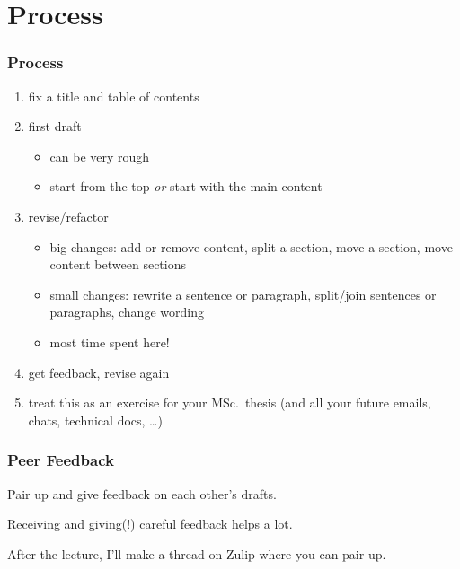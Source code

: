 \documentclass[xetex]{beamer}
\begin{document}
\section{Process}

\begin{frame}
  \frametitle{Process}

  \begin{enumerate}[<+->]
    \item fix a title and table of contents
    \item first draft
          \begin{itemize}
            \item can be very rough
            \item start from the top \emph{or} start with the main content
          \end{itemize}
    \item revise/refactor
          \begin{itemize}
            \item big changes: add or remove content, split a section, move a section, move content between sections
            \item small changes: rewrite a sentence or paragraph, split/join sentences or paragraphs, change wording
            \item most time spent here!
          \end{itemize}
    \item get feedback, revise again
    \item treat this as an exercise for your MSc.\ thesis (and all your future emails, chats, technical docs, \dots)
  \end{enumerate}
\end{frame}

\begin{frame}
  \frametitle{Peer Feedback}

  Pair up and give feedback on each other's drafts.

  \medskip
  \pause

  Receiving and giving(!) careful feedback helps a lot.

  \medskip
  \pause

  After the lecture, I'll make a thread on Zulip where you can pair up.
\end{frame}
\end{document}
